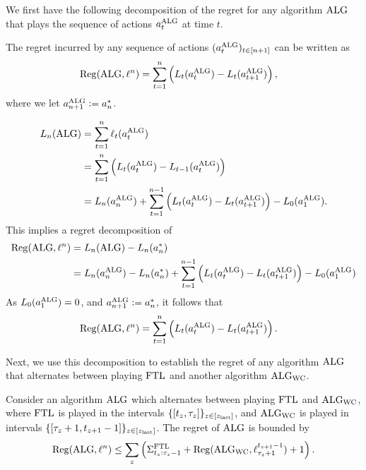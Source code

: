 
We first have the following decomposition of the regret for any algorithm $\text{ALG}$ that plays the sequence of actions $a^{\text{ALG}}_t$ at time $t$.
\begin{lemma} \label{regret_decomp}
The regret incurred by any sequence of actions $(a^{\text{ALG}}_t)_{t\in[n+1]}$ can be written as
\begin{align}
\mathrm{Reg}(\text{ALG}, \ell^n)
&= \sum_{t=1}^{n} \left(L_t(a^{\text{ALG}}_t) - L_{t}(a^{\text{ALG}}_{t+1}) \right),
\end{align}
where we let $a_{n+1}^{\text{ALG}} := a_n^*$.
\end{lemma}

\begin{align}
L_n(\text{ALG})
&= \sum_{t=1}^n \ell_t(a^{\text{ALG}}_t) \\
&= \sum_{t=1}^n \left(L_t(a^{\text{ALG}}_t) - L_{t-1}(a^{\text{ALG}}_t) \right) \\
&= L_n(a^{\text{ALG}}_n) + \sum_{t=1}^{n-1} \left(L_t(a^{\text{ALG}}_t) - L_{t}(a^{\text{ALG}}_{t+1}) \right) - L_0(a^{\text{ALG}}_1).
\end{align}
This implies a regret decomposition of
\begin{align}
\mathrm{Reg}(\text{ALG}, \ell^n)
&= L_n(\text{ALG}) - L_n(a_n^*) \\
&= L_n(a^{\text{ALG}}_n) - L_n(a_n^*) + \sum_{t=1}^{n-1} \left(L_t(a^{\text{ALG}}_t) - L_{t}(a^{\text{ALG}}_{t+1}) \right) - L_0(a^{\text{ALG}}_1)
\end{align}
As $L_0(a^{\text{ALG}}_1) = 0$, and $a_{n+1}^{\text{ALG}} := a_n^*$, it follows that 
\begin{align}
\mathrm{Reg}(\text{ALG}, \ell^n)
&= \sum_{t=1}^{n} \left(L_t(a^{\text{ALG}}_t) - L_{t}(a^{\text{ALG}}_{t+1}) \right).
\end{align}
\hfill \Halmos
\endproof

Next, we use this decomposition to establish the regret of any algorithm $\text{ALG}$ that alternates between playing $\text{FTL}$ and another algorithm $\text{ALG}_{\text{WC}}$.

\begin{lemma} \label{small_loss_regret_lemma}
Consider an algorithm $\text{ALG}$ which alternates between playing $\text{FTL}$ and $\text{ALG}_{\text{WC}}$, where $\text{FTL}$ is played in the intervals $\{[t_z, \tau_z]\}_{z\in[z_{\mathrm{last}}]}$, and $\text{ALG}_{\text{WC}}$ is played in intervals $\{[\tau_z +1, t_{z+1}-1]\}_{z\in[z_{\mathrm{last}}]}$. The regret of $\text{ALG}$ is bounded by
\begin{align}
\mathrm{Reg}(\text{ALG}, \ell^n) \leq
\sum_z \left(\Sigma^{\text{FTL}}_{t_z:\tau_z-1} + \mathrm{Reg}(\text{ALG}_{\text{WC}}, \ell_{\tau_z+1}^{t_{z+1}-1}) + 1\right).
\end{align}
\end{lemma}

